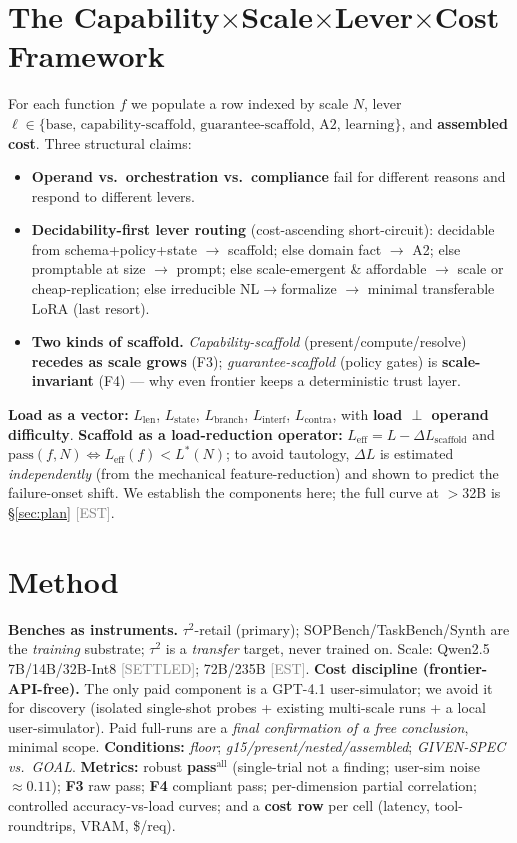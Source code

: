 \documentclass[10pt]{article}
\newcommand{\est}{\textcolor{gray}{\small[EST]}}
\newcommand{\settled}{\textcolor{gray}{\small[SETTLED]}}
\begin{document}
\section{The Capability$\times$Scale$\times$Lever$\times$Cost Framework}\label{sec:framework}
For each function $f$ we populate a row indexed by scale $N$, lever $\ell \in \{\text{base, capability-scaffold, guarantee-scaffold, A2, learning}\}$, and \textbf{assembled cost}. Three structural claims:
\begin{itemize}\itemsep1pt
\item \textbf{Operand vs.\ orchestration vs.\ compliance} fail for different reasons and respond to different levers.
\item \textbf{Decidability-first lever routing} (cost-ascending short-circuit): decidable from schema+policy+state $\to$ scaffold; else domain fact $\to$ A2; else promptable at size $\to$ prompt; else scale-emergent \& affordable $\to$ scale or cheap-replication; else irreducible NL$\to$formalize $\to$ minimal transferable LoRA (last resort).
\item \textbf{Two kinds of scaffold.} \emph{Capability-scaffold} (present/compute/resolve) \textbf{recedes as scale grows} (F3); \emph{guarantee-scaffold} (policy gates) is \textbf{scale-invariant} (F4) --- why even frontier keeps a deterministic trust layer.
\end{itemize}
\textbf{Load as a vector:} $L_{\mathrm{len}}$, $L_{\mathrm{state}}$, $L_{\mathrm{branch}}$, $L_{\mathrm{interf}}$, $L_{\mathrm{contra}}$, with \textbf{load $\perp$ operand difficulty}. \textbf{Scaffold as a load-reduction operator:} $L_{\mathrm{eff}} = L - \Delta L_{\mathrm{scaffold}}$ and $\mathrm{pass}(f,N) \Leftrightarrow L_{\mathrm{eff}}(f) < L^*(N)$; to avoid tautology, $\Delta L$ is estimated \emph{independently} (from the mechanical feature-reduction) and shown to predict the failure-onset shift. We establish the components here; the full curve at $>$32B is \S\ref{sec:plan} \est.

\section{Method}\label{sec:method}
\textbf{Benches as instruments.} $\tau^2$-retail (primary); SOPBench/TaskBench/Synth are the \emph{training} substrate; $\tau^2$ is a \emph{transfer} target, never trained on. Scale: Qwen2.5 7B/14B/32B-Int8 \settled; 72B/235B \est.
\textbf{Cost discipline (frontier-API-free).} The only paid component is a GPT-4.1 user-simulator; we avoid it for discovery (isolated single-shot probes + existing multi-scale runs + a local user-simulator). Paid full-runs are a \emph{final confirmation of a free conclusion}, minimal scope.
\textbf{Conditions:} \emph{floor}; \emph{g15/present/nested/assembled}; \emph{GIVEN-SPEC vs.\ GOAL}.
\textbf{Metrics:} robust \textbf{pass$^{\mathrm{all}}$} (single-trial not a finding; user-sim noise $\approx0.11$); \textbf{F3} raw pass; \textbf{F4} compliant pass; per-dimension partial correlation; controlled accuracy-vs-load curves; and a \textbf{cost row} per cell (latency, tool-roundtrips, VRAM, \$/req).
\end{document}
